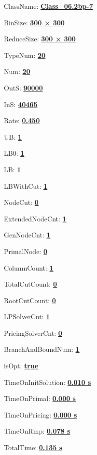 \documentclass[11pt]{article}
\begin{document}
\pagestyle{empty}


ClassName: \underline{\textbf{Class_06.2bp-7}}
\par
BinSize: \underline{\textbf{300 × 300}}
\par
ReduceSize: \underline{\textbf{300 × 300}}
\par
TypeNum: \underline{\textbf{20}}
\par
Num: \underline{\textbf{20}}
\par
OutS: \underline{\textbf{90000}}
\par
InS: \underline{\textbf{40465}}
\par
Rate: \underline{\textbf{0.450}}
\par
UB: \underline{\textbf{1}}
\par
LB0: \underline{\textbf{1}}
\par
LB: \underline{\textbf{1}}
\par
LBWithCut: \underline{\textbf{1}}
\par
NodeCut: \underline{\textbf{0}}
\par
ExtendedNodeCnt: \underline{\textbf{1}}
\par
GenNodeCnt: \underline{\textbf{1}}
\par
PrimalNode: \underline{\textbf{0}}
\par
ColumnCount: \underline{\textbf{1}}
\par
TotalCutCount: \underline{\textbf{0}}
\par
RootCutCount: \underline{\textbf{0}}
\par
LPSolverCnt: \underline{\textbf{1}}
\par
PricingSolverCnt: \underline{\textbf{0}}
\par
BranchAndBoundNum: \underline{\textbf{1}}
\par
isOpt: \underline{\textbf{true}}
\par
TimeOnInitSolution: \underline{\textbf{0.010 s}}
\par
TimeOnPrimal: \underline{\textbf{0.000 s}}
\par
TimeOnPricing: \underline{\textbf{0.000 s}}
\par
TimeOnRmp: \underline{\textbf{0.078 s}}
\par
TotalTime: \underline{\textbf{0.135 s}}
\par
\newpage
\end{document}
